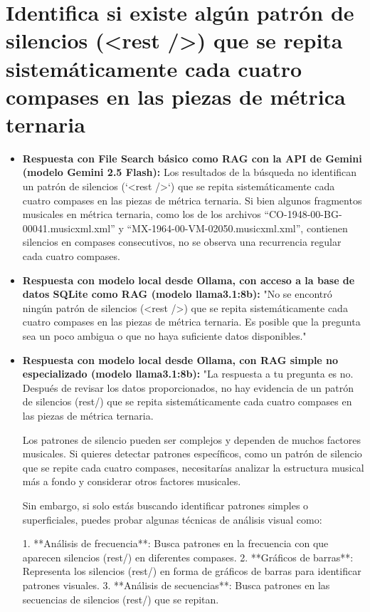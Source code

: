 \section{Identifica si existe algún patrón de silencios (<rest />) que se repita sistemáticamente cada cuatro compases en las piezas de métrica ternaria}
\begin{itemize}
    \item \textbf{Respuesta con File Search básico como RAG con la API de Gemini (modelo Gemini 2.5 Flash):} Los resultados de la búsqueda no identifican un patrón de silencios (`<rest />`) que se repita sistemáticamente cada cuatro compases en las piezas de métrica ternaria. Si bien algunos fragmentos musicales en métrica ternaria, como los de los archivos ``CO-1948-00-BG-00041.musicxml.xml'' y ``MX-1964-00-VM-02050.musicxml.xml'', contienen silencios en compases consecutivos, no se observa una recurrencia regular cada cuatro compases.
    \item \textbf{Respuesta con modelo local desde Ollama, con acceso a la base de datos SQLite como RAG (modelo llama3.1:8b):} "No se encontró ningún patrón de silencios (<rest />) que se repita sistemáticamente cada cuatro compases en las piezas de métrica ternaria. Es posible que la pregunta sea un poco ambigua o que no haya suficiente datos disponibles."
    \item \textbf{Respuesta con modelo local desde Ollama, con RAG simple no especializado (modelo llama3.1:8b):} "La respuesta a tu pregunta es no. Después de revisar los datos proporcionados, no hay evidencia de un patrón de silencios (rest/) que se repita sistemáticamente cada cuatro compases en las piezas de métrica ternaria.

Los patrones de silencio pueden ser complejos y dependen de muchos factores musicales. Si quieres detectar patrones específicos, como un patrón de silencio que se repite cada cuatro compases, necesitarías analizar la estructura musical más a fondo y considerar otros factores musicales.

Sin embargo, si solo estás buscando identificar patrones simples o superficiales, puedes probar algunas técnicas de análisis visual como:

1. **Análisis de frecuencia**: Busca patrones en la frecuencia con que aparecen silencios (rest/) en diferentes compases.
2. **Gráficos de barras**: Representa los silencios (rest/) en forma de gráficos de barras para identificar patrones visuales.
3. **Análisis de secuencias**: Busca patrones en las secuencias de silencios (rest/) que se repitan.


\end{itemize}
